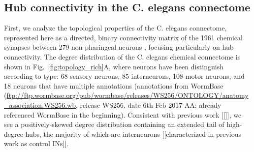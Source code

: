 \documentclass[10pt,letterpaper]{article}
\begin{document}
\subsection*{Hub connectivity in the C. elegans connectome}


First, we analyze the topological properties of the C. elegans connectome, represented here as a directed, binary connectivity matrix of the 1961 chemical synapses between 279 non-pharingeal neurons \cite{Varshney2011}, focusing particularly on hub connectivity.
The degree distribution of the C. elegans chemical connectome is shown in Fig.~\ref{fig:topology_rich}A, where neurons have been distinguish according to type: 68 sensory neurons, 85 interneurons, 108 motor neurons, and 18 neurons that have multiple annotations (annotations from WormBase (\url{ftp://ftp.wormbase.org/pub/wormbase/releases/WS256/ONTOLOGY/anatomy_association.WS256.wb}, release WS256, date 6th Feb 2017 AA: already referenced WormBase in the beginning). 
Consistent with previous work [[]], we see a positively-skewed degree distribution containing an extended tail of high-degree hubs, the majority of which are interneurons [[characterized in previous work as control INs]].
\end{document}
